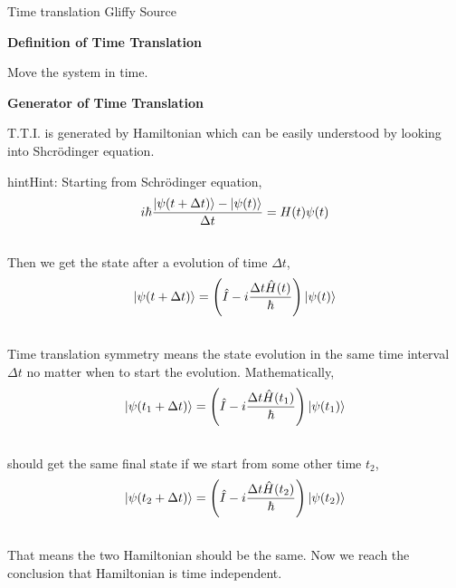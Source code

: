 \documentclass[letterpaper,10pt,english]{sphinxmanual}
\newcommand{\ket}[1]{\left| #1\right\rangle}
\begin{document}
Time translation Gliffy Source

\textbf{Definition of Time Translation}

Move the system in time.

\textbf{Generator of Time Translation}

T.T.I. is generated by Hamiltonian which can be easily understood by looking into Shcrödinger equation.

\begin{notice}{hint}{Hint:}
Starting from Schrödinger equation,
\begin{gather}
\begin{split}i\hbar \frac{\ket{\psi(t+\Delta t)} - \ket{\psi(t)}}{\Delta t} = H(t)\psi(t)\end{split}\notag\\\begin{split}\end{split}\notag
\end{gather}
Then we get the state after a evolution of time $\Delta t$,
\begin{gather}
\begin{split}\ket{\psi(t+\Delta t)} = \left( \hat I - i\frac{\Delta t \hat H(t)}{\hbar} \right) \ket{\psi(t)}\end{split}\notag\\\begin{split}\end{split}\notag
\end{gather}
Time translation symmetry means the state evolution in the same time interval $\Delta t$ no matter when to start the evolution. Mathematically,
\begin{gather}
\begin{split}\ket{\psi(t_1 +\Delta t)} = \left( \hat I - i\frac{\Delta t \hat H(t_1)}{\hbar} \right) \ket{\psi(t_1)}\end{split}\notag\\\begin{split}\end{split}\notag
\end{gather}
should get the same final state if we start from some other time $t_2$,
\begin{gather}
\begin{split}\ket{\psi(t_2 +\Delta t)} = \left( \hat I - i\frac{\Delta t \hat H(t_2)}{\hbar} \right) \ket{\psi(t_2)}\end{split}\notag\\\begin{split}\end{split}\notag
\end{gather}
That means the two Hamiltonian should be the same. Now we reach the conclusion that Hamiltonian is time independent.
\end{notice}
\end{document}
